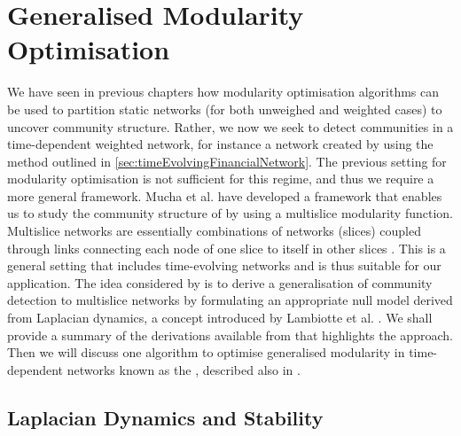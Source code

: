 
\section{Generalised Modularity Optimisation}
\label{sec:generalisedModularityOptimisation}

We have seen in previous chapters how modularity optimisation algorithms can be used to partition static networks (for both unweighed and weighted cases) to uncover community structure.
Rather, we now we seek to detect communities in a time-dependent weighted network, for instance a network created by using the method outlined in \cref{sec:timeEvolvingFinancialNetwork}.
The previous setting for modularity optimisation is not sufficient for this regime, and thus we require a more general framework.
Mucha et al. \cite{MRM+10} have developed a framework that enables us to study the community structure of  by using a multislice modularity function.
Multislice networks are essentially combinations of networks (slices) coupled through links connecting each node of one slice to itself in other slices \cite{MRM+10}.
This is a general setting that includes time-evolving networks and is thus suitable for our application.
The idea considered by \cite{MRM+10} is to derive a generalisation of community detection to multislice networks by formulating an appropriate null model derived from Laplacian dynamics, a concept introduced by Lambiotte et al. \cite{LDB08}.
We shall provide a summary of the derivations available from \cite{LDB08,Lam10,MRM+10} that highlights the approach.
Then we will discuss one algorithm to optimise generalised modularity in time-dependent networks known as the , described also in \cite{MRM+10,MFF+11,BPW+13}.


\subsection{Laplacian Dynamics and Stability}
\label{subsec:laplacianDynamicsAndStability}

